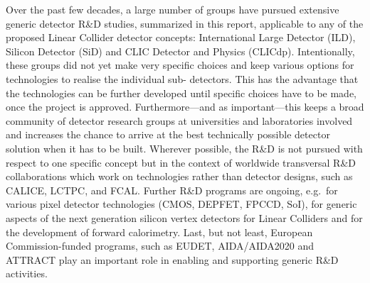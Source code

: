 \documentclass[10pt,final]{report}
\begin{document}
Over the past few decades, a large number of groups have pursued extensive generic
detector R\&D studies, summarized in this report, applicable to any of the proposed Linear
Collider detector concepts: International Large Detector (ILD), Silicon Detector (SiD) and
CLIC Detector and Physics (CLICdp). Intentionally, these groups did not yet make very
specific choices and keep various options for technologies to realise the individual sub-
detectors. This has the advantage that the technologies can be further developed until
specific choices have to be made, once the project is approved. Furthermore---and as important---this
keeps a broad community of detector research groups at universities and laboratories
involved and increases the chance to arrive at the best technically possible detector solution
when it has to be built. Wherever possible, the R\&D is not pursued with respect to one
specific concept but in the context of worldwide transversal R\&D collaborations which work
on technologies rather than detector designs, such as CALICE, LCTPC, and FCAL. Further
R\&D programs are ongoing, e.g.\ for various pixel detector technologies
(CMOS, DEPFET, FPCCD, SoI), for generic aspects of the next generation silicon vertex
detectors for Linear Colliders and for the development of forward calorimetry. Last, but not
least, European Commission-funded programs, such as EUDET, AIDA/AIDA2020 and
ATTRACT play an important role in enabling and supporting generic R\&D activities.
\end{document}
